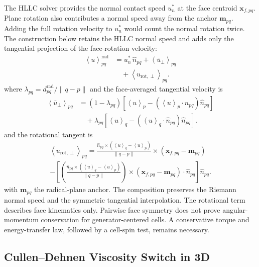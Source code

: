 \documentclass[twocolumn]{aastex63}
\newcommand{\vel}{{u}}
\newcommand{\vect}[1]{\mathbf{#1}}
\begin{document}
The HLLC solver provides the normal contact speed $\vel^*_n$ at the face
centroid $\vect{x}_{f,pq}$. Plane rotation also contributes a normal speed
away from the anchor $\vect{m}_{pq}$. Adding the full rotation velocity to
$\vel^*_n$ would count the normal rotation twice. The construction below
retains the HLLC normal speed and adds only the tangential projection of the
face-rotation velocity:
\begin{equation}\label{eq:vface3d}
  \begin{aligned}
  \left<\vel\right>_{pq}^\textrm{rad}
  &=\vel^*_n\,\hat{n}_{pq}
    +\left<\bar{\vel}_\perp\right>_{pq}\\
  &\quad+\left<\vel_{\mathrm{rot},\perp}\right>_{pq}.
  \end{aligned}
\end{equation}
where $\lambda_{pq}=d_{pq}^\textrm{rad}/\|q-p\|$ and the face-averaged
tangential velocity is
\begin{equation}
  \begin{aligned}
  \left<\bar{\vel}_\perp\right>_{pq}
  &=(1-\lambda_{pq})\left[\left<\vel\right>_p
    -(\left<\vel\right>_p\cdot\hat{n}_{pq})\hat{n}_{pq}\right]\\
  &\quad+\lambda_{pq}\left[\left<\vel\right>_q
    -(\left<\vel\right>_q\cdot\hat{n}_{pq})\hat{n}_{pq}\right].
  \end{aligned}
\end{equation}
and the rotational tangent is
\begin{multline}
  \left<\vel_{\mathrm{rot},\perp}\right>_{pq}
  =\frac{\hat{n}_{pq}\times
    (\left<\vel\right>_q - \left<\vel\right>_p)}
    {\|q - p\|}
    \times (\vect{x}_{f,pq} - \vect{m}_{pq})\\
  -\left[\left(\frac{\hat{n}_{pq}\times
    (\left<\vel\right>_q - \left<\vel\right>_p)}
    {\|q - p\|}\right)\times
    (\vect{x}_{f,pq} - \vect{m}_{pq})\cdot\hat{n}_{pq}\right]\hat{n}_{pq}.
\end{multline}
with $\vect{m}_{pq}$ the radical-plane anchor. The composition preserves the
Riemann normal speed and the symmetric tangential interpolation. The
rotational term describes face kinematics only. Pairwise face symmetry does
not prove angular-momentum conservation for generator-centered cells. A
conservative torque and energy-transfer law, followed by a cell-spin test,
remains necessary.


\subsection{Cullen--Dehnen Viscosity Switch in 3D}
\end{document}
